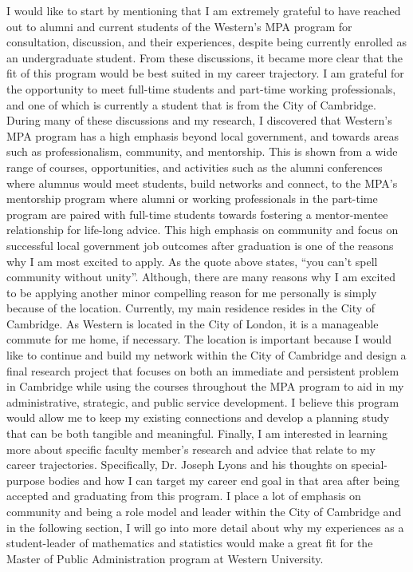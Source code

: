 \documentclass[11pt, a4paper]{awesome-cv}
\begin{document}
\begin{cvletter}
\newpage
I would like to start by mentioning that I am extremely grateful to have reached out to alumni and current students of the Western's MPA program for consultation, discussion, and their experiences, despite being currently enrolled as an undergraduate student. From these discussions, it became more clear that the fit of this program would be best suited in my career trajectory. I am grateful for the opportunity to meet full-time students and part-time working professionals, and one of which is currently a student that is from the City of Cambridge. During many of these discussions and my research, I discovered that Western's MPA program has a high emphasis beyond local government, and towards areas such as professionalism, community, and mentorship. This is shown from a wide range of courses, opportunities, and activities such as the alumni conferences where alumnus would meet students, build networks and connect, to the MPA's mentorship program where alumni or working professionals in the part-time program are paired with full-time students towards fostering a mentor-mentee relationship for life-long advice. This high emphasis on community and focus on successful local government job outcomes after graduation is one of the reasons why I am most excited to apply. As the quote above states, “you can't spell community without unity”. Although, there are many reasons why I am excited to be applying another minor compelling reason for me personally is simply because of the location. Currently, my main residence resides in the City of Cambridge. As Western is located in the City of London, it is a manageable commute for me home, if necessary. The location is important because I would like to continue and build my network within the City of Cambridge and design a final research project that focuses on both an immediate and persistent problem in Cambridge while using the courses throughout the MPA program to aid in my administrative, strategic, and public service development. I believe this program would allow me to keep my existing connections and develop a planning study that can be both tangible and meaningful. Finally, I am interested in learning more about specific faculty member's research and advice that relate to my career trajectories. Specifically, Dr. Joseph Lyons and his thoughts on special-purpose bodies and how I can target my career end goal in that area after being accepted and graduating from this program. I place a lot of emphasis on community and being a role model and leader within the City of Cambridge and in the following section, I will go into more detail about why my experiences as a student-leader of mathematics and statistics would make a great fit for the Master of Public Administration program at Western University.


\end{cvletter}
\end{document}
